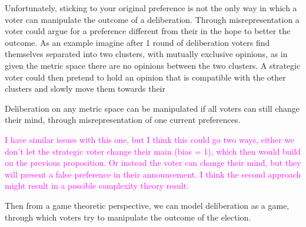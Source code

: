Unfortunately, sticking to your original preference is not the only way in which a  voter can manipulate the outcome of a deliberation. Through misrepresentation a voter could argue for a preference different from their in the hope to better the outcome. As an example imagine after 1 round of deliberation voters find themselves separated into two clusters, with mutually exclusive opinions, as in given the metric space there are no opinions between the two clusters. A strategic voter could then pretend to hold an opinion that is compatible with the other clusters and slowly move them towards their


\begin{proposition}
	Deliberation on any metric space can be manipulated if all voters can still change their mind, through misrepresentation of one current preferences.
\end{proposition}

\textcolor{Fuchsia}{I have similar issues with this one, but I think this could go two ways, either we don't let the strategic voter change their main (bias = 1), which then would build on the previous proposition. Or instead the voter can change their mind, but they will present a false preference in their announcement. I think the second approach might result in a possible complexity theory result.}

Then from a game theoretic perspective, we can model deliberation as a game, through which voters try to manipulate the outcome of the election.
